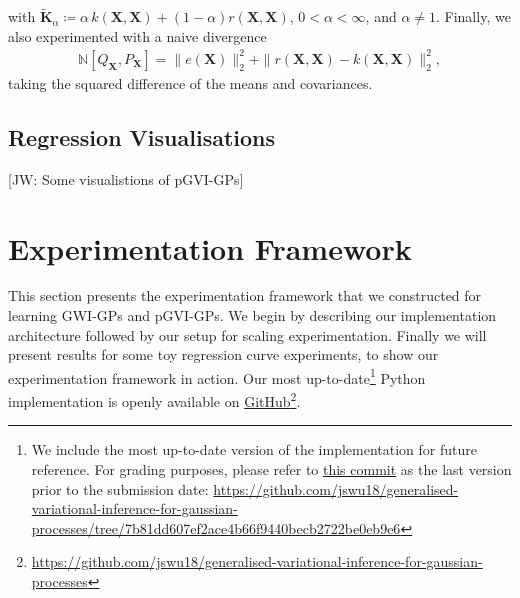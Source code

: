 \documentclass{article}
\newcommand{\jw}[1]{{\color{gray} [JW: #1]}}
\numberwithin{equation}{section}
\begin{document}
with $\tilde{\textbf{K}}_{\alpha} \coloneqq \alpha \, k(\mathbf{X}, \mathbf{X}) + (1-\alpha)  r(\mathbf{X}, \mathbf{X})$, $0 < \alpha < \infty$, and $\alpha \neq 1$.
Finally, we also experimented with a naive divergence
\begin{align}
    \mathbb{N} \left[Q_{\mathbf{X}}, P_{\mathbf{X}}\right] = \| e(\mathbf{X})\|_2^2 + \|r(\mathbf{X}, \mathbf{X})-k(\mathbf{X}, \mathbf{X})\|_2^2,
\end{align}
taking the squared difference of the means and covariances. 

\subsection{Regression Visualisations}
\jw{Some visualistions of pGVI-GPs}

\newpage
\section{Experimentation Framework}
This section presents the experimentation framework that we constructed for learning GWI-GPs and pGVI-GPs. 
We begin by describing our implementation architecture followed by our setup for scaling experimentation. 
Finally we will present results for some toy regression curve experiments, to show our experimentation framework in action.
Our most up-to-date\footnote{We include the most up-to-date version of the implementation for future reference. For grading purposes, please refer to \href{https://github.com/jswu18/generalised-variational-inference-for-gaussian-processes/tree/7b81dd607ef2ace4b66f9440becb2722be0eb9e6}{this commit} as the last version prior to the submission date: \href{https://github.com/jswu18/generalised-variational-inference-for-gaussian-processes/tree/7b81dd607ef2ace4b66f9440becb2722be0eb9e6}{https://github.com/jswu18/generalised-variational-inference-for-gaussian-processes/tree/7b81dd607ef2ace4b66f9440becb2722be0eb9e6}} Python implementation is openly available on \href{https://github.com/jswu18/generalised-variational-inference-for-gaussian-processes}{GitHub}\footnote{\href{https://github.com/jswu18/generalised-variational-inference-for-gaussian-processes}{https://github.com/jswu18/generalised-variational-inference-for-gaussian-processes}}. 
\end{document}
